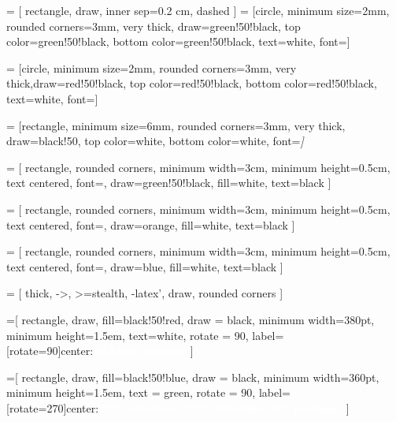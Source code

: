  = [
    rectangle,
    draw,
    inner sep=0.2 cm,
    dashed
]
 = [circle,
					 minimum size=2mm,
                     rounded corners=3mm,
					 very thick,
                     draw=green!50!black,
                     top color=green!50!black,
                     bottom color=green!50!black,
                     text=white,
                     font=\tiny]

 = [circle,
				  minimum size=2mm,
                  rounded corners=3mm,
                  very thick,draw=red!50!black,
                  top color=red!50!black,
                  bottom color=red!50!black,
                  text=white,
                  font=\tiny]

 = [rectangle,
						minimum size=6mm,
                        rounded corners=3mm,
                        very thick,
                        draw=black!50,
                        top color=white,
                        bottom color=white,
                        font=\itshape\footnotesize]

 = [
	rectangle,
	rounded corners,
    minimum width=3cm,
    minimum height=0.5cm,
    text centered,
    font=\footnotesize,
    draw=green!50!black,
    fill=white,
    text=black
]

 = [
	rectangle,
    rounded corners,
    minimum width=3cm,
    minimum height=0.5cm,
    text centered,
    font=\footnotesize,
    draw=orange,
    fill=white,
    text=black
]

 = [
	rectangle,
	rounded corners,
    minimum width=3cm,
    minimum height=0.5cm,
    text centered,
    font=\footnotesize,
    draw=blue,
    fill=white,
    text=black
]

 = [
	thick,
    ->,
    >=stealth,
    -latex',
    draw,
    rounded corners
]

=[
	rectangle,
    draw,
    fill=black!50!red,
    draw = black,
    minimum width=380pt,
    minimum height=1.5em,
    text=white,
    rotate = 90,
    label={[rotate=90]center:\textcolor{white}{\textbf{ELMER package}}}
]

=[
	rectangle,
	draw,
    fill=black!50!blue,
    draw = black,
    minimum width=360pt,
    minimum height=1.5em,
    text = green,
    rotate = 90,
    label={[rotate=270]center:\textcolor{white}{\textbf{TCGAbiolinks/TCGAbiolinksGUI packages}}}
]


